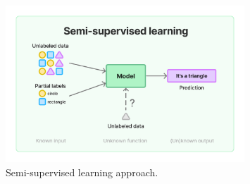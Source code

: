 \begin{description}
    \begin{figure}[H]
        \centering
        \includegraphics[width=0.8\textwidth, interpolate=false]{img/theoretical/semi-supervised.pdf}
        \caption{Semi-supervised learning approach.}
        \label{fig:semi-supervised-learning}
    \end{figure}


\end{description}
